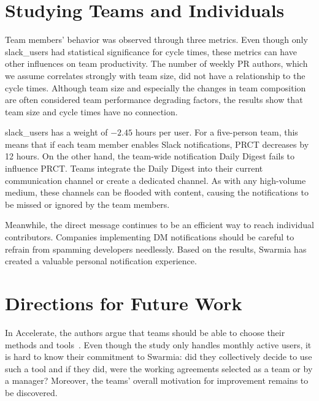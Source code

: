\section{Studying Teams and Individuals}


Team members' behavior was observed through three metrics. Even though only slack\_users had statistical significance for cycle times, these metrics can have other influences on team productivity. The number of weekly PR authors, which we assume correlates strongly with team size, did not have a relationship to the cycle times. Although team size and especially the changes in team composition are often considered team performance degrading factors, the results show that team size and cycle times have no connection. 

slack\_users has a weight of $-2.45$ hours per user. For a five-person team, this means that if each team member enables Slack notifications, PRCT decreases by 12 hours. On the other hand, the team-wide notification Daily Digest fails to influence PRCT. Teams integrate the Daily Digest into their current communication channel or create a dedicated channel. As with any high-volume medium, these channels can be flooded with content, causing the notifications to be missed or ignored by the team members.

Meanwhile, the direct message continues to be an efficient way to reach individual contributors. Companies implementing DM notifications should be careful to refrain from spamming developers needlessly. Based on the results, Swarmia has created a valuable personal notification experience. 


\section{Directions for Future Work}

In Accelerate, the authors argue that teams should be able to choose their methods and tools~\cite{forsgren_accelerate_2018}. Even though the study only handles monthly active users, it is hard to know their commitment to Swarmia: did they collectively decide to use such a tool and if they did, were the working agreements selected as a team or by a manager?
 Moreover, the teams' overall motivation for improvement remains to be discovered.

